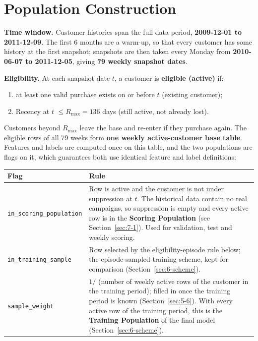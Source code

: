 \section{Population Construction}
\label{sec:5-3}

\textbf{Time window.} Customer histories span the full data period, \textbf{2009-12-01 to 2011-12-09}. The first 6 months are a warm-up, so that every customer has some history at the first snapshot; snapshots are then taken every Monday from \textbf{2010-06-07 to 2011-12-05}, giving \textbf{79 weekly snapshot dates}.

\textbf{Eligibility.} At each snapshot date $t$, a customer is \textbf{eligible (active)} if:
\begin{enumerate}
    \item at least one valid purchase exists on or before $t$ (existing customer);
    \item Recency at $t$ $\leq R_{\max} = 136$ days (still active, not already lost).
\end{enumerate}
Customers beyond $R_{\max}$ leave the base and re-enter if they purchase again. The eligible rows of all 79 weeks form \textbf{one weekly active-customer base table}. Features and labels are computed once on this table, and the two populations are flags on it, which guarantees both use identical feature and label definitions:

\begin{center}
\begin{tabular}{@{}p{4.6cm}p{9.5cm}@{}}
    \toprule
    Flag & Rule \\
    \midrule
    \texttt{in\_scoring\_population} & Row is active and the customer is not under suppression at $t$. The historical data contain no real campaigns, so suppression is empty and every active row is in the \textbf{Scoring Population} (see Section~\ref{sec:7-1}). Used for validation, test and weekly scoring. \\
    \texttt{in\_training\_sample} & Row selected by the eligibility-episode rule below; the episode-sampled training scheme, kept for comparison (Section~\ref{sec:6-scheme}). \\
    \texttt{sample\_weight} & $1 /$ (number of weekly active rows of the customer in the training period); filled in once the training period is known (Section~\ref{sec:5-6}). With every active row of the training period, this is the \textbf{Training Population} of the final model (Section~\ref{sec:6-scheme}). \\
    \bottomrule
\end{tabular}
\end{center}

